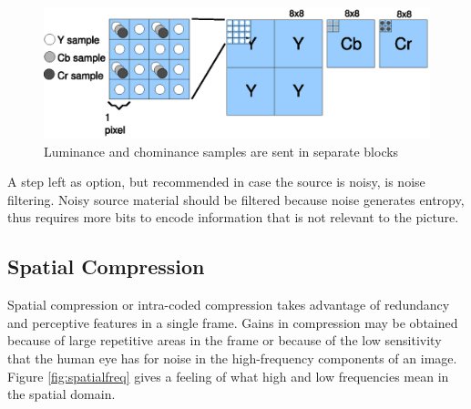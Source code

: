 \documentclass[a4paper, 12pt]{article}
\begin{document}
\begin{figure}[h]
\includegraphics{figs/blocks.eps}
\caption{Luminance and chominance samples are sent in separate blocks}
\label{fig:blocks}
\end{figure}

	A step left as option, but recommended in case the source is noisy, is noise filtering. Noisy source material should be filtered because noise generates entropy, thus requires more bits to encode information that is not relevant to the picture.

\subsection{Spatial Compression}

	Spatial compression or intra-coded compression takes advantage of redundancy and perceptive features in a single frame. Gains in compression may be obtained because of large repetitive areas in the frame or because of the low sensitivity that the human eye has for noise in the high-frequency components of an image. Figure \ref{fig:spatialfreq} gives a feeling of what high and low frequencies mean in the spatial domain.
\end{document}
